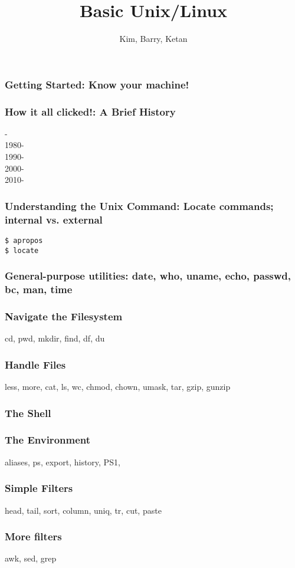 \documentclass[hyperref={pdfpagelabels=false},12pt]{beamer}
\title[Basic Unix/Linux]{{Basic Unix/Linux}}
\author[Basic Unix/Linux]{{Kim, Barry, Ketan}}
\date{}
\begin{document}
\begin{frame}[plain]
\titlepage
\end{frame}

\begin{frame}
\frametitle{Getting Started: Know your machine!}
\centering

\end{frame}

\begin{frame}
\frametitle{How it all clicked!: A Brief History}
-\\
1980-\\
1990-\\
2000-\\
2010-\\
\end{frame}

\begin{frame}
\frametitle{Understanding the Unix Command: Locate commands; internal vs. external}
\centering
\texttt{\$ apropos}\\ 
\texttt{\$ locate}
\end{frame}

\begin{frame}
\frametitle{General-purpose utilities: date, who, uname, echo, passwd, bc, man, time}
\centering

\end{frame}

\begin{frame}
\frametitle{Navigate the Filesystem}
\centering
cd, pwd, mkdir, find, df, du
\end{frame}

\begin{frame}
\frametitle{Handle Files}
\centering
less, more, cat, ls, wc, chmod, chown, umask, tar, gzip, gunzip
\end{frame}

\begin{frame}
\frametitle{The Shell}
\end{frame}

\begin{frame}
\frametitle{The Environment}
\centering
aliases, ps, export, history, PS1, 
\end{frame}

\begin{frame}
\frametitle{Simple Filters}
\centering
head, tail, sort, column, uniq, tr, cut, paste 
\end{frame}

\begin{frame}
\frametitle{More filters}
\centering
awk, sed, grep
\end{frame}
\end{document}
